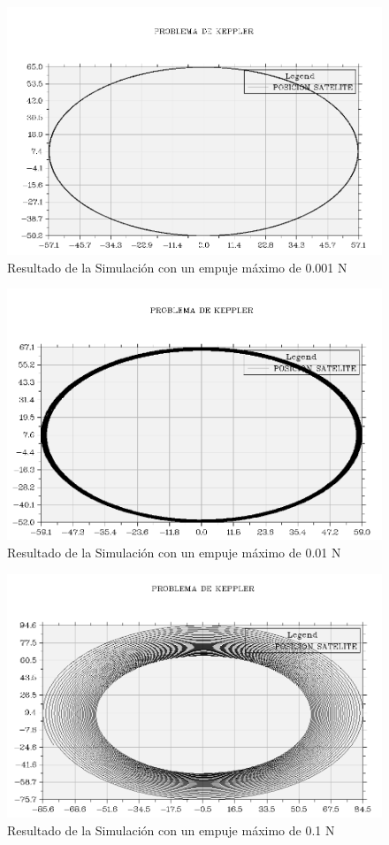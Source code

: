 \documentclass[11pt,singlespacing,liststotoc,headsepline,a4paper]{article}
\begin{document}
\begin{figure}[H]
	\centering
	\includegraphics[width=1\textwidth]{E0001_100T.PNG}
	\caption{Resultado de la Simulación con un empuje máximo de 0.001 N}
	\label{E=0.001}
\end{figure}

\begin{figure}[H]
	\centering
	\includegraphics[width=1\textwidth]{E001_100T.PNG}
	\caption{Resultado de la Simulación con un empuje máximo de 0.01 N}
	\label{E=0.01}
\end{figure}

\begin{figure}[H]
	\centering
	\includegraphics[width=1\textwidth]{E01_100T.PNG}
	\caption{Resultado de la Simulación con un empuje máximo de 0.1 N}
	\label{E=0.1}
\end{figure}
\end{document}
